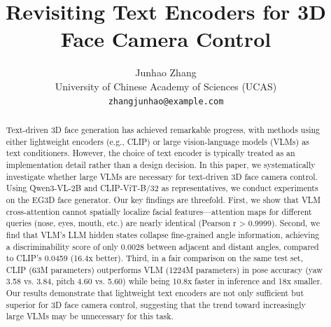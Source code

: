 \documentclass[10pt,twocolumn,letterpaper]{article}
\title{\vspace{-0.5in}Revisiting Text Encoders for 3D Face Camera Control}
\author{
  Junhao Zhang \\
  University of Chinese Academy of Sciences (UCAS) \\
  \texttt{zhangjunhao@example.com}
}
\begin{document}
\maketitle
\thispagestyle{empty}

\begin{abstract}
Text-driven 3D face generation has achieved remarkable progress, with methods using either lightweight encoders (e.g., CLIP) or large vision-language models (VLMs) as text conditioners. However, the choice of text encoder is typically treated as an implementation detail rather than a design decision. In this paper, we systematically investigate whether large VLMs are necessary for text-driven 3D face camera control. Using Qwen3-VL-2B and CLIP-ViT-B/32 as representatives, we conduct experiments on the EG3D face generator. Our key findings are threefold. First, we show that VLM cross-attention cannot spatially localize facial features---attention maps for different queries (nose, eyes, mouth, etc.) are nearly identical (Pearson r > 0.9999). Second, we find that VLM's LLM hidden states collapse fine-grained angle information, achieving a discriminability score of only 0.0028 between adjacent and distant angles, compared to CLIP's 0.0459 (16.4x better). Third, in a fair comparison on the same test set, CLIP (63M parameters) outperforms VLM (1224M parameters) in pose accuracy (yaw 3.58{\textdegree} vs. 3.84{\textdegree}, pitch 4.60{\textdegree} vs. 5.60{\textdegree}) while being 10.8x faster in inference and 18x smaller. Our results demonstrate that lightweight text encoders are not only sufficient but superior for 3D face camera control, suggesting that the trend toward increasingly large VLMs may be unnecessary for this task.
\end{abstract}
\end{document}
